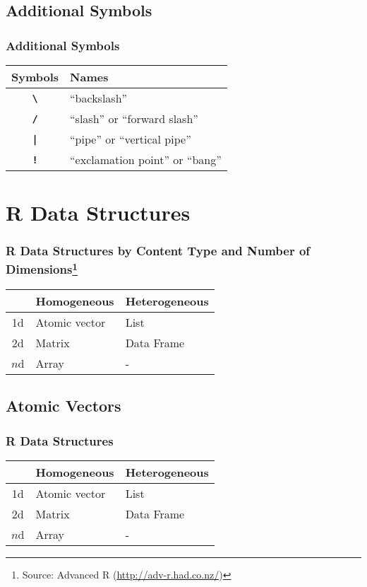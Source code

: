 \documentclass{beamer}
\newcommand{\R}[1]{\texttt{#1}}
\begin{document}
\subsection{Additional Symbols}
\begin{frame}
\frametitle{Additional Symbols}


\begin{table}
\begin{tabular}{c|l}
Symbols & Names \\ \hline
\textbf{\R{\textbackslash}} & ``backslash''  \\
\textbf{\R{/}} & ``slash'' or ``forward slash'' \\
\textbf{\R{|}} & ``pipe'' or ``vertical pipe'' \\
\textbf{\R{!}} & ``exclamation point'' or ``bang'' \\
\end{tabular}
\end{table}


\end{frame}


\section{R Data Structures}
\begin{frame}
\frametitle{R Data Structures by Content Type and Number of Dimensions\footnote{Source: Advanced R (\url{http://adv-r.had.co.nz/})}}

\begin{table}
\begin{tabular}{c|ll}
   & Homogeneous   & Heterogeneous \\ \hline
1d & Atomic vector & List \\
2d & Matrix        & Data Frame \\
$n$d & Array       & - \\ 
\end{tabular}
\end{table}

\end{frame}



\subsection{Atomic Vectors}

\begin{frame}
\frametitle{R Data Structures}

\begin{table}
\begin{tabular}{c|ll}
   &  Homogeneous   & Heterogeneous \\ \hline
1d & \cellcolor{gray!25} Atomic vector &  List \\
2d & Matrix        & Data Frame \\
$n$d & Array       & - \\ 
\end{tabular}
\end{table}

\end{frame}
\end{document}

